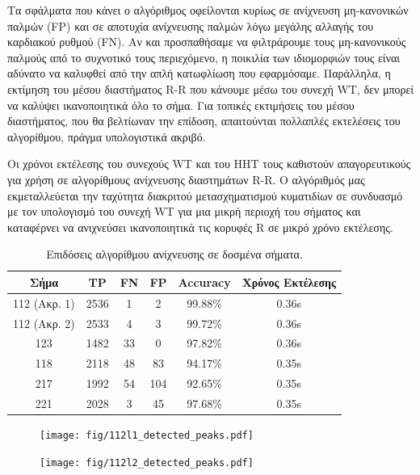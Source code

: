 \documentclass[11pt,a4paper]{article}
\begin{document}
Τα σφάλματα που κάνει ο αλγόριθμος οφείλονται κυρίως σε ανίχνευση μη-κανονικών παλμών (FP) και σε αποτυχία ανίχνευσης παλμών λόγω μεγάλης αλλαγής του καρδιακού ρυθμού (FN). Αν και προσπαθήσαμε να φιλτράρουμε τους μη-κανονικούς παλμούς από το συχνοτικό τους περιεχόμενο, η ποικιλία των ιδιομορφιών τους είναι αδύνατο να καλυφθεί από την απλή κατωφλίωση που εφαρμόσαμε. Παράλληλα, η εκτίμηση του μέσου διαστήματος R-R που κάνουμε μέσω του συνεχή WT, δεν μπορεί να καλύψει ικανοποιητικά όλο το σήμα. Για τοπικές εκτιμήσεις του μέσου διαστήματος, που θα βελτίωναν την επίδοση, απαιτούνται πολλαπλές εκτελέσεις του αλγορίθμου, πράγμα υπολογιστικά ακριβό.

Οι χρόνοι εκτέλεσης του συνεχούς WT και του HHT τους καθιστούν απαγορευτικούς για χρήση σε αλγορίθμους ανίχνευσης διαστημάτων R-R. Ο αλγόριθμός μας εκμεταλλεύεται την ταχύτητα διακριτού μετασχηματισμού κυματιδίων σε συνδυασμό με τον υπολογισμό του συνεχή WT για μια μικρή περιοχή του σήματος και καταφέρνει να ανιχνεύσει ικανοποιητικά τις κορυφές R σε μικρό χρόνο εκτέλεσης.


\begin{table}[H]
\begin{center}
\begin{tabular}{| c | c | c | c | c | c |}
 \hline
 Σήμα & TP & FN & FP & Accuracy & Χρόνος Εκτέλεσης \\ 
 \hline
 112 (Ακρ. 1) & 2536 & 1 & 2 & 99.88\% & 0.36s \\ 
 \hline
 112 (Ακρ. 2) & 2533 & 4 & 3 & 99.72\% & 0.36s \\ 
 \hline
 123 & 1482 & 33 & 0 & 97.82\% & 0.36s \\ 
 \hline
 118 & 2118 & 48 & 83 & 94.17\% & 0.35s \\ 
 \hline
 217 & 1992 & 54 & 104 & 92.65\% & 0.35s \\ 
 \hline
 221 & 2028 & 3 & 45 & 97.68\% & 0.35s \\ 
 \hline
\end{tabular}
\end{center}



\caption{Επιδόσεις αλγορίθμου ανίχνευσης σε δοσμένα σήματα.}
\label{tab:accuracy}
\end{table}


\begin{figure}[H]
\centering
\begin{minipage}{0.48\textwidth}
	\centering
	\texttt{[image: fig/112l1\_detected\_peaks.pdf]}
\end{minipage}
\begin{minipage}{0.48\textwidth}
	\centering
	\texttt{[image: fig/112l2\_detected\_peaks.pdf]}
\end{minipage}
\end{figure}
\end{document}
